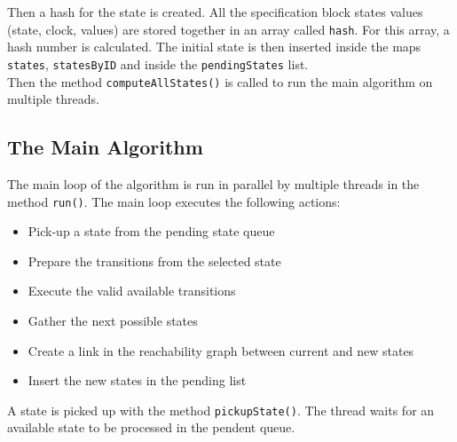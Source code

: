 \documentclass[12pt]{article}
\begin{document}
Then a hash for the state is created. All the specification block states values (state, clock, values) are stored together in an array called \texttt{hash}. For this array, a hash number is calculated. The initial state is then inserted inside the maps \texttt{states}, \texttt{statesByID} and inside the \texttt{pendingStates} list.\\

Then the method \texttt{computeAllStates()} is called to run the main algorithm on multiple threads.

\subsection{The Main Algorithm}
The main loop of the algorithm is run in parallel by multiple threads in the method \texttt{run()}. The main loop executes the following actions:
\begin{itemize}
\item Pick-up a state from the pending state queue
\item Prepare the transitions from the selected state
\item Execute the valid available transitions
\item Gather the next possible states
\item Create a link in the reachability graph between current and new states
\item Insert the new states in the pending list
\end{itemize}
A state is picked up with the method \texttt{pickupState()}. The thread waits for an available state to be processed in the pendent queue.\\
\end{document}
